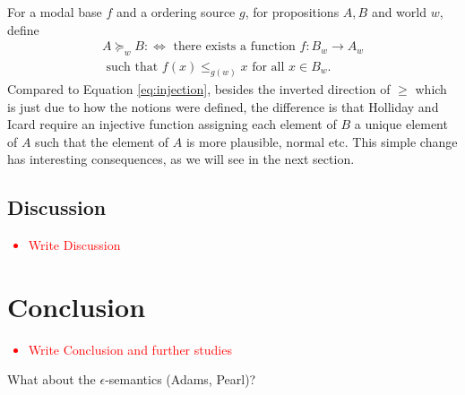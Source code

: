 \documentclass{article}
\theoremstyle{definition}
\newcommand\todo[1]{\textcolor{red}{#1}}
\begin{document}
For a modal base $f$ and a ordering source $g$, for propositions $A,B$ and world $w$, define
\begin{multline}
    \tag{2*}
    \label{eq:lifted-star}
    A \succeq_w B :\iff \text{ there exists a function } f: B_w \rightarrow A_w \\ \text{ such that } f(x) \leq_{g(w)} x \text{ for all } x \in B_w.
\end{multline}
Compared to Equation \ref{eq:injection}, besides the inverted direction of $\geq$ which is just due to how the notions were defined, the difference is that Holliday and Icard require an injective function assigning each element of $B$ a unique element of $A$ such that the element of $A$ is more plausible, normal etc. This simple change has interesting consequences, as we will see in the next section. 
\subsection{Discussion}
\todo{
  \begin{itemize}
    \item Write Discussion
  \end{itemize}
}
\section{Conclusion}
\todo{
  \begin{itemize}
    \item Write Conclusion and further studies
  \end{itemize}
}
What about the $\epsilon$-semantics (Adams, Pearl)? 
\nocite{hamblin59_modal_probab,holliday13_measur,harrison-trainor17_prefer,kratzer91_modal,lassiter10_gradab,yalcin10_probab_operat,kratzer98_seman}
 \printbibliography
\end{document}
